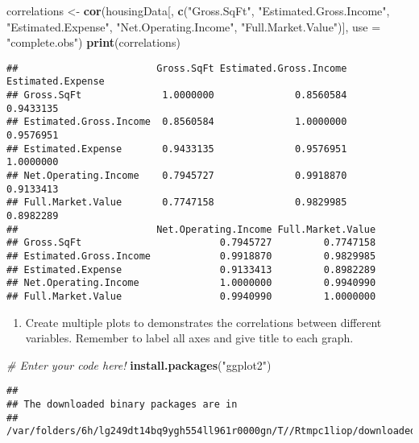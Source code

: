 \documentclass[
]{article}
\newenvironment{Shaded}{\begin{snugshade}}{\end{snugshade}}
\newcommand{\AttributeTok}[1]{\textcolor[rgb]{0.13,0.29,0.53}{#1}}
\newcommand{\CommentTok}[1]{\textcolor[rgb]{0.56,0.35,0.01}{\textit{#1}}}
\newcommand{\FunctionTok}[1]{\textcolor[rgb]{0.13,0.29,0.53}{\textbf{#1}}}
\newcommand{\NormalTok}[1]{#1}
\newcommand{\OtherTok}[1]{\textcolor[rgb]{0.56,0.35,0.01}{#1}}
\newcommand{\StringTok}[1]{\textcolor[rgb]{0.31,0.60,0.02}{#1}}
\providecommand{\tightlist}{%
  \setlength{\itemsep}{0pt}\setlength{\parskip}{0pt}}
\begin{document}
\begin{Shaded}
\begin{Highlighting}[]
\NormalTok{correlations }\OtherTok{\textless{}{-}} \FunctionTok{cor}\NormalTok{(housingData[, }\FunctionTok{c}\NormalTok{(}\StringTok{"Gross.SqFt"}\NormalTok{, }\StringTok{"Estimated.Gross.Income"}\NormalTok{, }\StringTok{"Estimated.Expense"}\NormalTok{, }
                                     \StringTok{"Net.Operating.Income"}\NormalTok{, }\StringTok{"Full.Market.Value"}\NormalTok{)], }\AttributeTok{use =} \StringTok{"complete.obs"}\NormalTok{)}
\FunctionTok{print}\NormalTok{(correlations)}
\end{Highlighting}
\end{Shaded}

\begin{verbatim}
##                        Gross.SqFt Estimated.Gross.Income Estimated.Expense
## Gross.SqFt              1.0000000              0.8560584         0.9433135
## Estimated.Gross.Income  0.8560584              1.0000000         0.9576951
## Estimated.Expense       0.9433135              0.9576951         1.0000000
## Net.Operating.Income    0.7945727              0.9918870         0.9133413
## Full.Market.Value       0.7747158              0.9829985         0.8982289
##                        Net.Operating.Income Full.Market.Value
## Gross.SqFt                        0.7945727         0.7747158
## Estimated.Gross.Income            0.9918870         0.9829985
## Estimated.Expense                 0.9133413         0.8982289
## Net.Operating.Income              1.0000000         0.9940990
## Full.Market.Value                 0.9940990         1.0000000
\end{verbatim}

\begin{enumerate}
\def\labelenumi{\alph{enumi}.}
\setcounter{enumi}{1}
\tightlist
\item
  Create multiple plots to demonstrates the correlations between
  different variables. Remember to label all axes and give title to each
  graph.
\end{enumerate}

\begin{Shaded}
\begin{Highlighting}[]
\CommentTok{\# Enter your code here!}
\FunctionTok{install.packages}\NormalTok{(}\StringTok{"ggplot2"}\NormalTok{)}
\end{Highlighting}
\end{Shaded}

\begin{verbatim}
## 
## The downloaded binary packages are in
##  /var/folders/6h/lg249dt14bq9ygh554ll961r0000gn/T//Rtmpc1liop/downloaded_packages
\end{verbatim}
\end{document}
